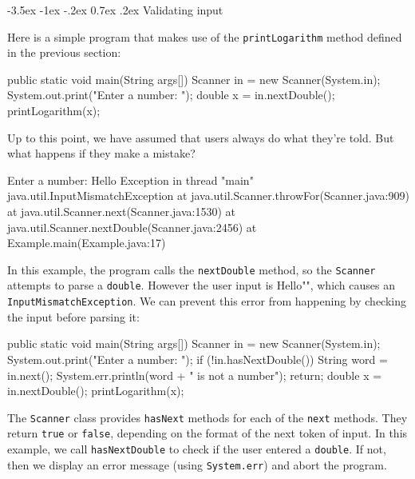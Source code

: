\documentclass[12pt]{book}
\makeatletter
\theoremstyle{exercise}
\newcommand{\java}[1]{\verb"#1"}
\renewcommand{\section}{\@startsection{section}{1}{\z@}%
    {-3.5ex \@plus -1ex \@minus -.2ex}%
    {0.7ex \@plus.2ex}%
    {\normalfont\Large\bfseries}}
\newcommand{\java}[1]{\lstinline{#1}} %
\makeatother
\begin{document}
\section{Validating input}

Here is a simple program that makes use of the \java{printLogarithm} method defined in the previous section:

\begin{code}
    public static void main(String args[]) {
        Scanner in = new Scanner(System.in);
        System.out.print("Enter a number: ");
        double x = in.nextDouble();
        printLogarithm(x);
    }
\end{code}

Up to this point, we have assumed that users always do what they're told.
But what happens if they make a mistake?


\begin{stdout}
Enter a number: Hello
Exception in thread "main" java.util.InputMismatchException
    at java.util.Scanner.throwFor(Scanner.java:909)
    at java.util.Scanner.next(Scanner.java:1530)
    at java.util.Scanner.nextDouble(Scanner.java:2456)
    at Example.main(Example.java:17)
\end{stdout}


In this example, the program calls the \java{nextDouble} method, so the \java{Scanner} attempts to parse a \java{double}.
However the user input is \java{"Hello"}, which causes an \java{InputMismatchException}.
We can prevent this error from happening by checking the input before parsing it:

\begin{code}
    public static void main(String args[]) {
        Scanner in = new Scanner(System.in);
        System.out.print("Enter a number: ");
        if (!in.hasNextDouble()) {
            String word = in.next();
            System.err.println(word + " is not a number");
            return;
        }
        double x = in.nextDouble();
        printLogarithm(x);
    }
\end{code}

The \java{Scanner} class provides \java{hasNext} methods for each of the \java{next} methods.
They return \java{true} or \java{false}, depending on the format of the next token of input.
In this example, we call \java{hasNextDouble} to check if the user entered a \java{double}.
If not, then we display an error message (using \java{System.err}) and abort the program.
\end{document}
